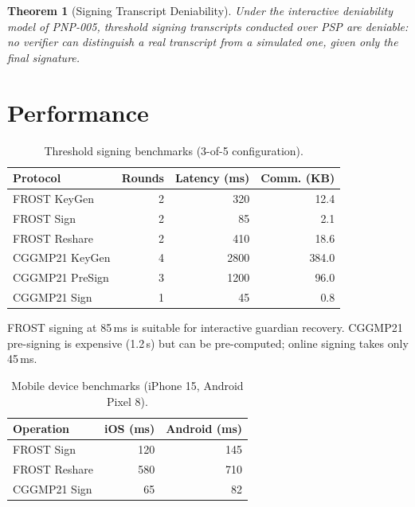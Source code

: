 \documentclass[11pt,a4paper]{article}
\newtheorem{theorem}{Theorem}[section]
\begin{document}
\begin{theorem}[Signing Transcript Deniability]
    Under the interactive deniability model of PNP-005, threshold signing
    transcripts conducted over PSP are deniable: no verifier can
    distinguish a real transcript from a simulated one, given only the
    final signature.
\end{theorem}

\section{Performance}
\label{sec:performance}

\begin{table}[h]
\centering
\caption{Threshold signing benchmarks (3-of-5 configuration).}
\label{tab:bench}
\begin{tabular}{@{}lrrr@{}}
\toprule
\textbf{Protocol} & \textbf{Rounds} & \textbf{Latency (ms)} & \textbf{Comm. (KB)} \\
\midrule
FROST KeyGen   & 2 & 320 & 12.4 \\
FROST Sign     & 2 & 85  & 2.1 \\
FROST Reshare  & 2 & 410 & 18.6 \\
CGGMP21 KeyGen & 4 & 2800 & 384.0 \\
CGGMP21 PreSign & 3 & 1200 & 96.0 \\
CGGMP21 Sign   & 1 & 45  & 0.8 \\
\bottomrule
\end{tabular}
\end{table}

FROST signing at 85\,ms is suitable for interactive guardian recovery.
CGGMP21 pre-signing is expensive (1.2\,s) but can be pre-computed;
online signing takes only 45\,ms.

\begin{table}[h]
\centering
\caption{Mobile device benchmarks (iPhone 15, Android Pixel 8).}
\label{tab:mobile}
\begin{tabular}{@{}lrr@{}}
\toprule
\textbf{Operation} & \textbf{iOS (ms)} & \textbf{Android (ms)} \\
\midrule
FROST Sign   & 120 & 145 \\
FROST Reshare & 580 & 710 \\
CGGMP21 Sign & 65  & 82 \\
\bottomrule
\end{tabular}
\end{table}
\end{document}
